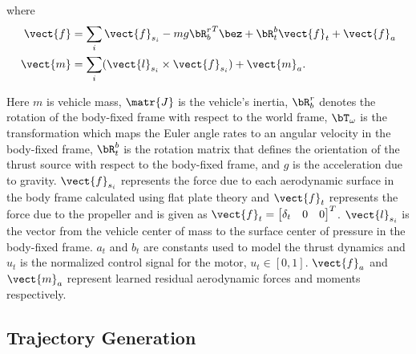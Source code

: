 where 
\begin{align}
\vect{f}&= \sum_i\vect{f}_{s_i} - mg{\bR_b^r}^T \bez + {\bR_{t}^b}\vect{f}_{t} + \vect{f}_a\nonumber\\
\vect{m}&= \sum_{i}(\vect{l}_{s_i} \times \vect{f}_{s_i}) + \vect{m}_a .
\end{align}

Here $m$ is vehicle mass, $\matr{J}$ is the vehicle's inertia, $\bR_b^r$ denotes the rotation of the body-fixed frame with respect to the world frame, ${\bT}_{\omega}$ is the transformation which maps the Euler angle rates to an angular velocity in the body-fixed frame, $\bR_{t}^b$ is the rotation matrix that defines the orientation of the thrust source with respect to the body-fixed frame, and $g$ is the acceleration due to gravity. $\vect{f}_{s_i}$ represents the force due to each aerodynamic surface in the body frame calculated using flat plate theory and $\vect{f}_{t}$ represents the force due to the propeller and is given as $\vect{f}_{t}=\begin{bmatrix}\delta_{t} & 0 & 0\end{bmatrix}^T$. $\vect{l}_{s_i}$ is the vector from the vehicle center of mass to the surface center of pressure in the body-fixed frame. $a_t$ and $b_t$ are constants used to model the thrust dynamics and $u_t$ is the normalized control signal for the motor, $u_t\in{[0,1]} $. $\vect{f}_a$ and $\vect{m}_a$ represent learned residual aerodynamic forces and moments respectively.


\subsection{Trajectory Generation}

